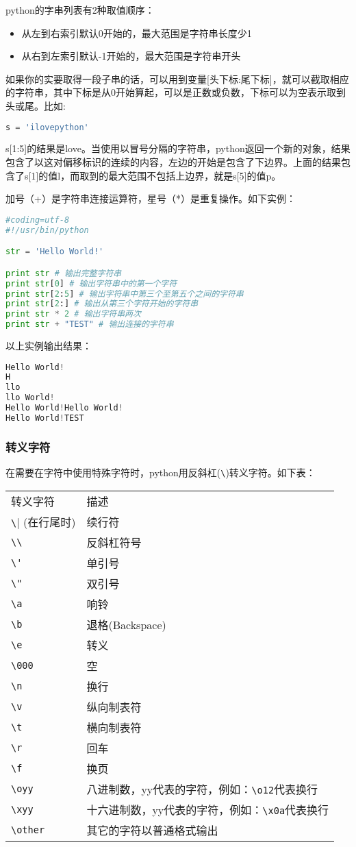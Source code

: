 python的字串列表有2种取值顺序：
\begin{itemize}
\item 从左到右索引默认0开始的，最大范围是字符串长度少1
\item 从右到左索引默认-1开始的，最大范围是字符串开头
\end{itemize}
如果你的实要取得一段子串的话，可以用到变量[头下标:尾下标]，就可以截取相应的字符串，其中下标是从0开始算起，可以是正数或负数，下标可以为空表示取到头或尾。比如:
\begin{lstlisting}[language=Python]
s = 'ilovepython'
\end{lstlisting}
s[1:5]的结果是love。当使用以冒号分隔的字符串，python返回一个新的对象，结果包含了以这对偏移标识的连续的内容，左边的开始是包含了下边界。上面的结果包含了s[1]的值l，而取到的最大范围不包括上边界，就是s[5]的值p。

加号（+）是字符串连接运算符，星号（*）是重复操作。如下实例：
\begin{lstlisting}[language=Python]
#coding=utf-8
#!/usr/bin/python

str = 'Hello World!'

print str # 输出完整字符串
print str[0] # 输出字符串中的第一个字符
print str[2:5] # 输出字符串中第三个至第五个之间的字符串
print str[2:] # 输出从第三个字符开始的字符串
print str * 2 # 输出字符串两次
print str + "TEST" # 输出连接的字符串
\end{lstlisting}
以上实例输出结果：
\begin{lstlisting}[language=Python]
Hello World!
H
llo
llo World!
Hello World!Hello World!
Hello World!TEST
\end{lstlisting}


\subsubsection{转义字符}
在需要在字符中使用特殊字符时，python用反斜杠(\verb|\|)转义字符。如下表：

\begin{tabular}{l|l}
转义字符&	描述\\
\verb|\| (在行尾时)&	续行符\\
\verb|\\|	&反斜杠符号\\
\verb|\'|	&单引号\\
\verb|\"|	&双引号\\
\verb|\a|	&响铃\\
\verb|\b|	&退格(Backspace)\\
\verb|\e|	&转义\\
\verb|\000|	&空\\
\verb|\n|	&换行\\
\verb|\v|	&纵向制表符\\
\verb|\t|	&横向制表符\\
\verb|\r|	&回车\\
\verb|\f|	&换页\\
\verb|\oyy|	&八进制数，yy代表的字符，例如：\verb|\o12|代表换行\\
\verb|\xyy|	&十六进制数，yy代表的字符，例如：\verb|\x0a|代表换行\\
\verb|\other|	&其它的字符以普通格式输出
\end{tabular}



